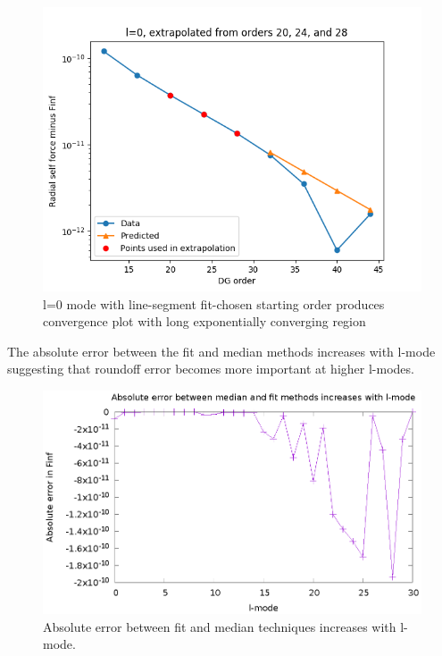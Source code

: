 \begin{figure}
  \includegraphics{fittingtechniqet370l0}
  \caption{l=0 mode with line-segment fit-chosen starting order produces convergence plot with long exponentially converging region}
  \label{goodbehavior}
\end{figure}

The absolute error between the fit and median methods increases with l-mode suggesting that roundoff error becomes more important at higher l-modes.

\begin{figure}
  \includegraphics{absErrorIncreaseslmode}
  \caption{Absolute error between fit and median techniques increases with l-mode.}
\end{figure}

